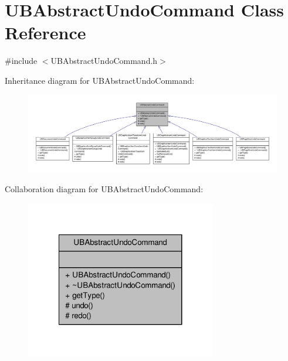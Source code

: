 \hypertarget{class_u_b_abstract_undo_command}{\section{U\-B\-Abstract\-Undo\-Command Class Reference}
\label{dd/d07/class_u_b_abstract_undo_command}
}


{\ttfamily \#include $<$U\-B\-Abstract\-Undo\-Command.\-h$>$}



Inheritance diagram for U\-B\-Abstract\-Undo\-Command\-:
\nopagebreak
\begin{figure}[H]
\begin{center}
\leavevmode
\includegraphics[width=350pt]{dc/dbb/class_u_b_abstract_undo_command__inherit__graph}
\end{center}
\end{figure}


Collaboration diagram for U\-B\-Abstract\-Undo\-Command\-:
\nopagebreak
\begin{figure}[H]
\begin{center}
\leavevmode
\includegraphics[width=236pt]{da/d78/class_u_b_abstract_undo_command__coll__graph}
\end{center}
\end{figure}
